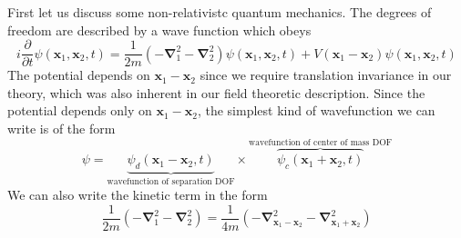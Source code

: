 \documentclass[11pt, notitlepage]{report}
\newcommand{\del}{\partial}
\numberwithin{equation}{section}
\begin{document}
    First let us discuss some non-relativistc quantum mechanics. The degrees of freedom are described by a wave function which obeys
    \begin{equation*}
        i\frac{\del}{\del t}\psi(\textbf{x}_1, \textbf{x}_2,t) = \frac{1}{2m}\left( -\mathbf\nabla_1^2 - \mathbf\nabla_2^2 \right) \psi(\textbf{x}_1, \textbf{x}_2,t) + V(\textbf{x}_1 - \textbf{x}_2)\psi(\textbf{x}_1, \textbf{x}_2,t) 
    \end{equation*}
    The potential depends on \(\textbf{x}_1-\textbf{x}_2\) since we require translation invariance in our theory, which was also inherent in our field theoretic description. Since the potential depends only on \(\textbf{x}_1 - \textbf{x}_2\), the simplest kind of wavefunction we can write is of the form
    \begin{equation*}
        \psi = \underbrace{\psi_d(\textbf{x}_1 - \textbf{x}_2, t)}_{\text{wavefunction of separation DOF}}\times \overbrace{\psi_c(\textbf{x}_1 + \textbf{x}_2, t)}^{\text{wavefunction of center of mass DOF}}
    \end{equation*} 
    We can also write the kinetic term in the form 
    \begin{equation*}
        \frac{1}{2m}\left( -\mathbf\nabla_1^2 - \mathbf\nabla_2^2 \right) = \frac{1}{4m}\left( -\mathbf\nabla_{\textbf{x}_1 - \textbf{x}_2}^2 - \mathbf\nabla_{\textbf{x}_1 + \textbf{x}_2}^2 \right)
    \end{equation*}
\end{document}

